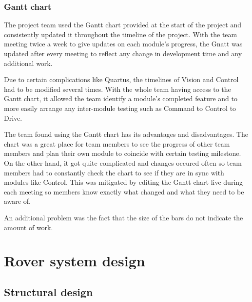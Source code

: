 \documentclass[11pt, a4paper]{article}
\begin{document}
\vfill
\pagebreak

\subsubsection{Gantt chart}

The project team used the Gantt chart provided at the start of the project and consistently updated it throughout the timeline of the project. With the team meeting twice a week to give updates on each module's progress, the Gnatt was updated after every meeting to reflect any change in development time and any additional work. 

Due to certain complications like Quartus, the timelines of Vision and Control had to be modified several times. With the whole team having access to the Gantt chart, it allowed the team identify a module's completed feature and to more easily arrange any inter-module testing such as Command to Control to Drive.  

The team found using the Gantt chart has its advantages and disadvantages. The chart was a great place for team members to see the progress of other team members and plan their own module to coincide with certain testing milestone. On the other hand, it got quite complicated and changes occured often so team members had to constantly check the chart to see if they are in sync with modules like Control. This was mitigated by editing the Gantt chart live during each meeting so members know exactly what changed and what they need to be aware of.

An additional problem was the fact that the size of the bars do not indicate the amount of work.




\vfill






\pagebreak
\section{Rover system design}

\subsection{Structural design}
\end{document}
